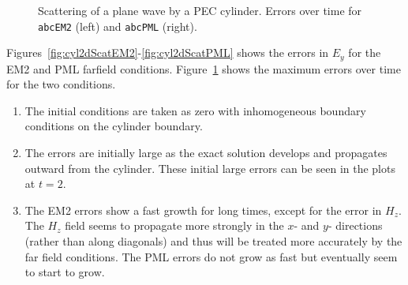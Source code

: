 \documentclass{article}
\begin{document}
{
\begin{figure}[hbt]
\newcommand{\figWidth}{8.cm}
\newcommand{\trimfig}[2]{\trimFig{#1}{#2}{0.}{0.0}{.0}{.0}}
\begin{center}
\end{center}
\caption{Scattering of a plane wave by a PEC cylinder. Errors over time for {\tt abcEM2} (left) and 
   {\tt abcPML} (right). }
\label{fig:cyl2dScatFarFieldComparison}
\end{figure}
}

Figures~\ref{fig:cyl2dScatEM2}-\ref{fig:cyl2dScatPML} shows the errors in $E_y$ for the EM2 and PML 
farfield conditions. Figure~\ref{fig:cyl2dScatFarFieldComparison} shows the maximum errors over
time for the two conditions.

\begin{enumerate}
  \item The initial conditions are taken as zero with inhomogeneous boundary conditions on the cylinder boundary.
  \item The errors are initially large as the exact solution develops and propagates outward
   from the cylinder. These initial large errors
   can be seen in the plots at $t=2$.
  \item The EM2 errors show a fast growth for long times, except for the error in $H_z$. The $H_z$ field seems to
          propagate more strongly in the $x$- and $y$- directions (rather than along diagonals) and thus will be
          treated more accurately by the far field conditions.
      The PML errors do not grow as fast but eventually seem to start to grow.
\end{enumerate}
\end{document}
